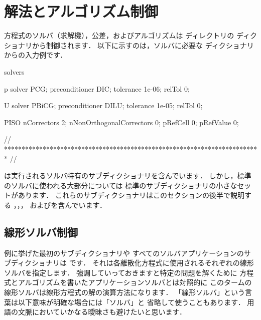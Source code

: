 \section{解法とアルゴリズム制御}
\label{sec:4.5}
方程式のソルバ（求解機），公差，およびアルゴリズムは
ディレクトリの
%
%
ディクショナリから制御されます．
以下に示すのは，ソルバに必要な
ディクショナリからの入力例です．
\begin{OFverbatim}[file, linenum=17]

solvers
{
    p
    {
        solver           PCG;
        preconditioner   DIC;
        tolerance        1e-06;
        relTol           0;
    }

    U
    {
        solver           PBiCG;
        preconditioner   DILU;
        tolerance        1e-05;
        relTol           0;
    }
}

PISO
{
    nCorrectors     2;
    nNonOrthogonalCorrectors 0;
    pRefCell        0;
    pRefValue       0;
}


// ************************************************************************* //
\end{OFverbatim}%
\label{p:U-117}%
は実行されるソルバ特有のサブディクショナリを含んでいます．
しかし，標準のソルバに使われる大部分については
標準のサブディクショナリの小さなセットがあります．
これらのサブディクショナリはこのセクションの後半で説明する
，，，
およびを含んでいます．


\subsection{線形ソルバ制御}
\label{ssec:4.5.1}
例に挙げた最初のサブディクショナリや
すべてのソルバアプリケーションのサブディクショナリは
%
%
です．
それは各離散化方程式に使用されるそれぞれの線形ソルバを指定します．
強調していっておきますと特定の問題を解くために
方程式とアルゴリズムを書いたアプリケーションソルバとは対照的に
このタームの線形ソルバは線形方程式の解の演算方法になります．
「線形ソルバ」という言葉は以下意味が明確な場合には「ソルバ」と
省略して使うこともあります．
用語の文脈においていかなる曖昧さも避けたいと思います．

